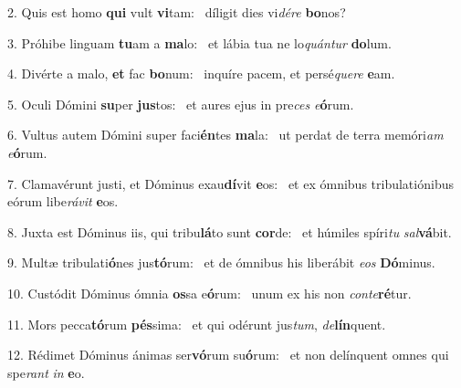 2. Quis est homo \textbf{qui} vult \textbf{vi}tam: \ast\  díligit dies vi\textit{dé}\textit{re} \textbf{bo}nos?\

3. Próhibe linguam \textbf{tu}am a \textbf{ma}lo: \ast\  et lábia tua ne lo\textit{quán}\textit{tur} \textbf{do}lum.\

4. Divérte a malo, \textbf{et} fac \textbf{bo}num: \ast\  inquíre pacem, et persé\textit{que}\textit{re} \textbf{e}am.\

5. Oculi Dómini \textbf{su}per \textbf{jus}tos: \ast\  et aures ejus in pre\textit{ces} \textit{e}\textbf{ó}rum.\

6. Vultus autem Dómini super faci\textbf{én}tes \textbf{ma}la: \ast\  ut perdat de terra memóri\textit{am} \textit{e}\textbf{ó}rum.\

7. Clamavérunt justi, et Dóminus exau\textbf{dí}vit \textbf{e}os: \ast\  et ex ómnibus tribulatiónibus eórum libe\textit{rá}\textit{vit} \textbf{e}os.\

8. Juxta est Dóminus iis, qui tribu\textbf{lá}to sunt \textbf{cor}de: \ast\  et húmiles spíri\textit{tu} \textit{sal}\textbf{vá}bit.\

9. Multæ tribulati\textbf{ó}nes jus\textbf{tó}rum: \ast\  et de ómnibus his liberábit \textit{e}\textit{os} \textbf{Dó}minus.\

10. Custódit Dóminus ómnia \textbf{os}sa e\textbf{ó}rum: \ast\  unum ex his non \textit{con}\textit{te}\textbf{ré}tur.\

11. Mors pecca\textbf{tó}rum \textbf{pés}sima: \ast\  et qui odérunt jus\textit{tum}, \textit{de}\textbf{lín}quent.\

12. Rédimet Dóminus ánimas ser\textbf{vó}rum su\textbf{ó}rum: \ast\  et non delínquent omnes qui spe\textit{rant} \textit{in} \textbf{e}o.\

